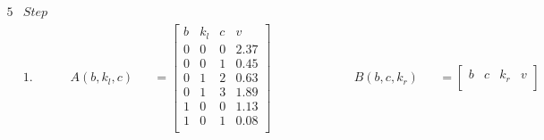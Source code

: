 \begin{figure}[H]
    \begin{alignat*}{5}
         & Step \  &                           &                &                                                                                      &                                                                                                       &  &  &  & \\
         & 1.      &                           & A(b, k_l, c)   &                                                                                      & = \begin{bmatrix}
                                                                                                                                                               b & k_l & c & v    \\
                                                                                                                                                               0 & 0   & 0 & 2.37 \\
                                                                                                                                                               0 & 0   & 1 & 0.45 \\
                                                                                                                                                               0 & 1   & 2 & 0.63 \\
                                                                                                                                                               0 & 1   & 3 & 1.89 \\
                                                                                                                                                               1 & 0   & 0 & 1.13 \\
                                                                                                                                                               1 & 0   & 1 & 0.08 \\
                                                                                                                                                           \end{bmatrix} \qquad
         &         & \qquad \quad B(b, c, k_r) &                & = \begin{bmatrix}
                                                                        b & c & k_r & v    \\

\end{bmatrix}
\end{alignat*}
\end{figure}
